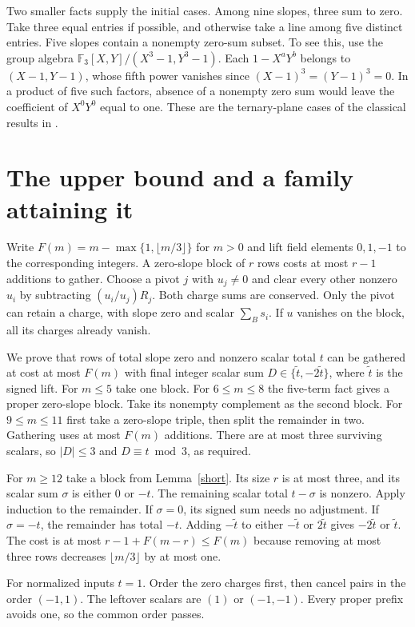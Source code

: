 \documentclass[a4paper,12pt]{article}
\newcommand{\F}{\mathbb F_3}
\begin{document}
Two smaller facts supply the initial cases. Among nine slopes, three sum to zero. Take three equal entries if possible, and otherwise take a line among five distinct entries. Five slopes contain a nonempty zero-sum subset. To see this, use the group algebra $\F[X,Y]/(X^3-1,Y^3-1)$. Each $1-X^aY^b$ belongs to $(X-1,Y-1)$, whose fifth power vanishes since $(X-1)^3=(Y-1)^3=0$. In a product of five such factors, absence of a nonempty zero sum would leave the coefficient of $X^0Y^0$ equal to one. These are the ternary-plane cases of the classical results in \cite{olson,reiher}.

\newpage
\section{The upper bound and a family attaining it}
Write $F(m)=m-\max\{1,\lfloor m/3\rfloor\}$ for $m>0$ and lift field elements $0,1,-1$ to the corresponding integers. A zero-slope block of $r$ rows costs at most $r-1$ additions to gather. Choose a pivot $j$ with $u_j\ne0$ and clear every other nonzero $u_i$ by subtracting $(u_i/u_j)R_j$. Both charge sums are conserved. Only the pivot can retain a charge, with slope zero and scalar $\sum_B s_i$. If $u$ vanishes on the block, all its charges already vanish.

We prove that rows of total slope zero and nonzero scalar total $t$ can be gathered at cost at most $F(m)$ with final integer scalar sum $D\in\{\tilde t,-2\tilde t\}$, where $\tilde t$ is the signed lift. For $m\le5$ take one block. For $6\le m\le8$ the five-term fact gives a proper zero-slope block. Take its nonempty complement as the second block. For $9\le m\le11$ first take a zero-slope triple, then split the remainder in two. Gathering uses at most $F(m)$ additions. There are at most three surviving scalars, so $|D|\le3$ and $D\equiv t\bmod3$, as required.

For $m\ge12$ take a block from Lemma~\ref{short}. Its size $r$ is at most three, and its scalar sum $\sigma$ is either $0$ or $-t$. The remaining scalar total $t-\sigma$ is nonzero. Apply induction to the remainder. If $\sigma=0$, its signed sum needs no adjustment. If $\sigma=-t$, the remainder has total $-t$. Adding $-\tilde t$ to either $-\tilde t$ or $2\tilde t$ gives $-2\tilde t$ or $\tilde t$. The cost is at most $r-1+F(m-r)\le F(m)$ because removing at most three rows decreases $\lfloor m/3\rfloor$ by at most one.

For normalized inputs $t=1$. Order the zero charges first, then cancel pairs in the order $(-1,1)$. The leftover scalars are $(1)$ or $(-1,-1)$. Every proper prefix avoids one, so the common order passes.
\end{document}
